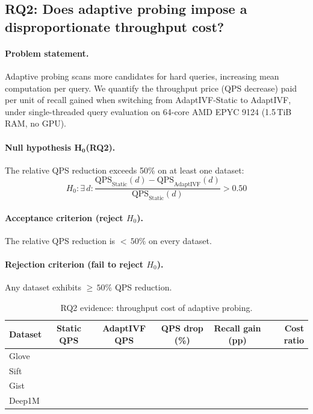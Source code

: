 \subsection{RQ2: Does adaptive probing impose a disproportionate throughput cost?}
\label{sec:appendix:rq2}

\paragraph{Problem statement.}
Adaptive probing scans more candidates for hard queries, increasing mean
computation per query.  We quantify the throughput price (QPS decrease) paid
per unit of recall gained when switching from AdaptIVF-Static to AdaptIVF,
under single-threaded query evaluation on 64-core AMD EPYC 9124 (1.5\,TiB
RAM, no GPU).

\paragraph{Null hypothesis $\boldsymbol{H_0}$(RQ2).}
The relative QPS reduction exceeds 50\% on at least one dataset:
\[
  H_0: \exists\, d : \frac{\text{QPS}_{\text{Static}}(d) - \text{QPS}_{\text{AdaptIVF}}(d)}{\text{QPS}_{\text{Static}}(d)} > 0.50
\]

\paragraph{Acceptance criterion (reject $H_0$).}
The relative QPS reduction is ${<}\,50\%$ on every dataset.

\paragraph{Rejection criterion (fail to reject $H_0$).}
Any dataset exhibits ${\geq}\,50\%$ QPS reduction.

\begin{table}[h]
\centering
\caption{RQ2 evidence: throughput cost of adaptive probing.}
\label{tab:appendix:rq2}
\begin{tabular}{lccccr}
\toprule
Dataset & Static QPS & AdaptIVF QPS & QPS drop (\%) & Recall gain (pp) & Cost ratio \\
\midrule
Glove  & \placeholder{\_\_\_} & \placeholder{\_\_\_} & \placeholder{\_\_\_} & \placeholder{\_\_\_} & \placeholder{\_\_\_} \\
Sift   & \placeholder{\_\_\_} & \placeholder{\_\_\_} & \placeholder{\_\_\_} & \placeholder{\_\_\_} & \placeholder{\_\_\_} \\
Gist   & \placeholder{\_\_\_} & \placeholder{\_\_\_} & \placeholder{\_\_\_} & \placeholder{\_\_\_} & \placeholder{\_\_\_} \\
Deep1M & \placeholder{\_\_\_} & \placeholder{\_\_\_} & \placeholder{\_\_\_} & \placeholder{\_\_\_} & \placeholder{\_\_\_} \\
\bottomrule
\end{tabular}
\end{table}

